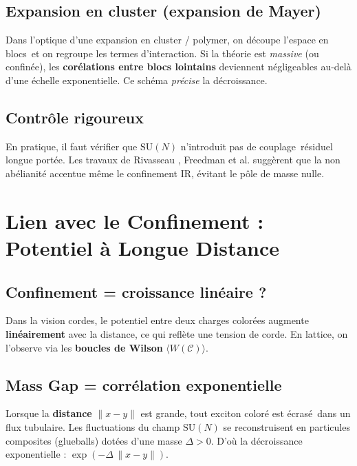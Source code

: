 \subsection*{Expansion en cluster (expansion de Mayer) }
Dans l’optique d’une expansion en cluster / polymer, on découpe l’espace en \og blocs\fg\ et on regroupe les termes d’interaction. Si la théorie est \emph{massive} (ou confinée), les \textbf{corélations entre blocs lointains} deviennent négligeables au-delà d’une échelle exponentielle. Ce schéma \emph{précise} la décroissance.

\subsection*{Contrôle rigoureux}
En pratique, il faut vérifier que \(\mathrm{SU}(N)\) n’introduit pas de \og couplage\fg\ résiduel longue portée. Les travaux de Rivasseau \cite{Rivasseau1991}, Freedman et al. \cite{Freedman1982} suggèrent que la non abélianité accentue même le confinement IR, évitant le pôle de masse nulle.

\vspace{1em}

\section{Lien avec le Confinement : Potentiel à Longue Distance}
\label{sec:9.4}

\subsection*{Confinement = croissance linéaire ?}
Dans la vision \og cordes\fg, le potentiel entre deux charges colorées augmente \textbf{linéairement} avec la distance, ce qui reflète une \og tension de corde\fg. En lattice, on l’observe via les \textbf{boucles de Wilson} \(\langle W(\mathcal{C})\rangle\).

\subsection*{Mass Gap = corrélation exponentielle}
Lorsque la \textbf{distance} \(\|x-y\|\) est grande, tout exciton coloré est \og écrasé\fg\ dans un flux tubulaire. Les fluctuations du champ \(\mathrm{SU}(N)\) se reconstruisent en particules composites (glueballs) dotées d’une masse \(\Delta>0\). D’où la décroissance exponentielle : \(\exp(-\Delta\,\|x-y\|)\).

